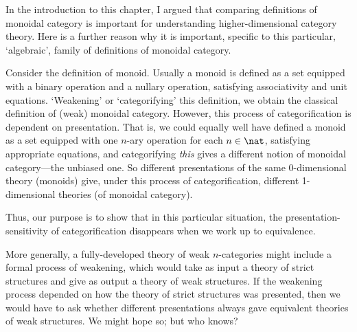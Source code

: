 In the introduction to this chapter, I argued that comparing definitions of
monoidal category is important for understanding higher-dimensional
category theory.  Here is a further reason why it is important, specific to
this particular, `algebraic', family of definitions of monoidal category.

Consider the definition of monoid.  Usually a monoid is defined as a set
equipped with a binary operation and a nullary operation, satisfying
associativity and unit equations.  `Weakening'%
%
%
or `categorifying'%
%
%
this
definition, we obtain the classical definition of (weak) monoidal category.
However, this process of categorification is dependent on presentation.%
%
%
That is, we could equally well have defined a monoid as a set equipped with
one $n$-ary operation for each $n\in\nat$, satisfying appropriate
equations, and categorifying \emph{this} gives a different notion of
monoidal category---the unbiased one.  So different presentations of
the same 0-dimensional theory (monoids) give, under this process of
categorification, different 1-dimensional theories (of monoidal category).

Thus, our purpose is to show that in this particular situation, the
presentation-sensitivity of categorification disappears when we work up to
equivalence.

More generally, a fully-developed theory of weak $n$-categories might
include a formal process of weakening, which would take as input a theory
of strict structures and give as output a theory of weak structures.  If
the weakening process depended on how the theory of strict structures was
presented, then we would have to ask whether different presentations always
gave equivalent theories of weak structures.  We might hope so; but who
knows?


